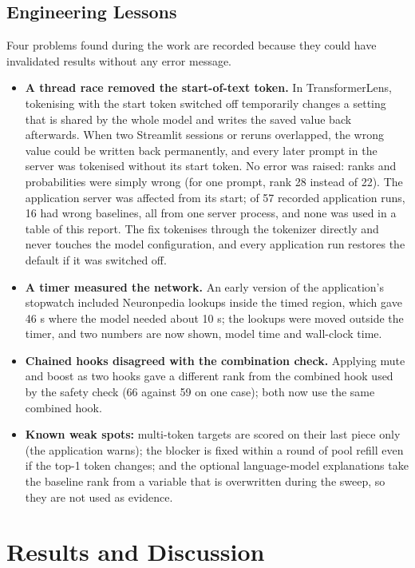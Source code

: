 \documentclass[12pt,a4paper]{report}
\begin{document}
\section{Engineering Lessons}\label{sec:lessons}

Four problems found during the work are recorded because they could have invalidated results without any error message.

\begin{itemize}
  \item \textbf{A thread race removed the start-of-text token.} In TransformerLens, tokenising with the start token switched off temporarily changes a setting that is shared by the whole model and writes the saved value back afterwards. When two Streamlit sessions or reruns overlapped, the wrong value could be written back permanently, and every later prompt in the server was tokenised without its start token. No error was raised: ranks and probabilities were simply wrong (for one prompt, rank 28 instead of 22). The application server was affected from its start; of 57 recorded application runs, 16 had wrong baselines, all from one server process, and none was used in a table of this report. The fix tokenises through the tokenizer directly and never touches the model configuration, and every application run restores the default if it was switched off.
  \item \textbf{A timer measured the network.} An early version of the application's stopwatch included Neuronpedia lookups inside the timed region, which gave 46 s where the model needed about 10 s; the lookups were moved outside the timer, and two numbers are now shown, model time and wall-clock time.
  \item \textbf{Chained hooks disagreed with the combination check.} Applying mute and boost as two hooks gave a different rank from the combined hook used by the safety check (66 against 59 on one case); both now use the same combined hook.
  \item \textbf{Known weak spots:} multi-token targets are scored on their last piece only (the application warns); the blocker is fixed within a round of pool refill even if the top-1 token changes; and the optional language-model explanations take the baseline rank from a variable that is overwritten during the sweep, so they are not used as evidence.
\end{itemize}

\chapter{Results and Discussion}\label{ch:results-and-discussion}
\end{document}
